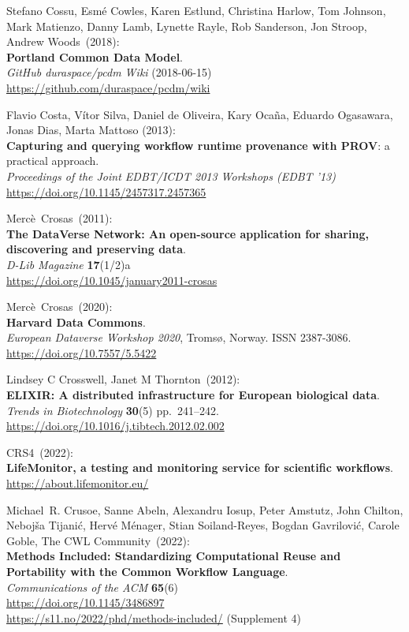 \begin{thebibliography}{9}
Stefano Cossu, Esmé Cowles, Karen Estlund, Christina Harlow,
Tom Johnson, Mark Matienzo, Danny Lamb, Lynette Rayle, Rob Sanderson,
Jon Stroop, Andrew Woods~(2018):\\
\textbf{Portland Common Data Model}.\\
\emph{GitHub duraspace/pcdm Wiki} (2018-06-15)\\
\url{https://github.com/duraspace/pcdm/wiki}

Flavio Costa, Vítor Silva, Daniel de Oliveira, Kary Ocaña, Eduardo Ogasawara, Jonas Dias, Marta Mattoso (2013):\\
\textbf{Capturing and querying workflow runtime provenance with PROV}: a practical approach.\\
\emph{Proceedings of the Joint EDBT/ICDT 2013 Workshops (EDBT '13)}\\
\url{https://doi.org/10.1145/2457317.2457365} 

Mercè~Crosas~(2011):\\
\textbf{The DataVerse Network: An open-source application for sharing,
discovering and preserving data}.\\
\emph{D-Lib Magazine} \textbf{17}(1/2)a\\
\url{https://doi.org/10.1045/january2011-crosas}

Mercè~Crosas~(2020):\\
\textbf{Harvard Data Commons}.\\
\emph{European Dataverse Workshop 2020}, Tromsø, Norway. ISSN
2387-3086.\\
\url{https://doi.org/10.7557/5.5422}

Lindsey C Crosswell, Janet M Thornton~(2012):\\
\textbf{ELIXIR: A distributed infrastructure for European biological
data}.\\
\emph{Trends in Biotechnology} \textbf{30}(5) pp.~241--242.\\
\url{https://doi.org/10.1016/j.tibtech.2012.02.002}

CRS4~(2022):\\
\textbf{LifeMonitor, a testing and monitoring service for scientific
workflows}.\\
\url{https://about.lifemonitor.eu/}

Michael~R. Crusoe, Sanne Abeln, Alexandru Iosup, Peter
Amstutz, John Chilton, Nebojša Tijanić, Hervé Ménager, Stian
Soiland-Reyes, Bogdan Gavrilović, Carole Goble, The CWL Community~(2022):\\
\textbf{Methods Included: Standardizing
Computational Reuse and Portability with the Common Workflow
Language}.\\
\emph{Communications of the ACM} \textbf{65}(6)\\
\url{https://doi.org/10.1145/3486897} \\
\url{https://s11.no/2022/phd/methods-included/} (Supplement 4)


\end{thebibliography}
